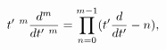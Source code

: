 \begin{equation}
\label{eq:lnder}
t^\prime\ ^m{d^m\over dt^\prime\ ^m}=\prod_{n=0}^{m-1}(t^\prime{d\over dt^\prime}-n),
\end{equation}

